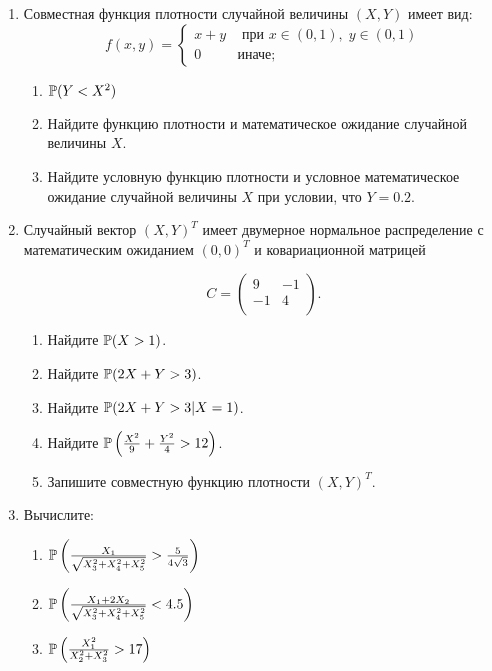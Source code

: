 \begin{enumerate}
\item  Совместная функция плотности случайной величины $(X,Y)$ имеет вид:
\begin{equation*}
f(x,y) =
 \begin{cases}
   x+y &\text{ при }x \in (0,1),\;y \in (0,1) \\
   0 &\text{иначе};
 \end{cases}
\end{equation*}

\begin{enumerate}
\item $\P(Y<X^2)$
\item Найдите функцию плотности и математическое ожидание случайной величины $X$.
\item Найдите условную функцию плотности и условное математическое ожидание случайной
величины $X$ при условии, что $Y=0.2$.
\end{enumerate}

\item Случайный вектор $(X,Y)^T$ имеет двумерное нормальное распределение
с математическим ожиданием $(0,0)^T$ и ковариационной матрицей

\[
C = \begin{pmatrix}
9 & -1 \\
-1 & 4 \\
\end{pmatrix}.
\]

\begin{enumerate}
\item Найдите $\P(X>1)$.
\item Найдите $\P(2X+Y>3)$.
\item Найдите $\P(2X+Y>3|X=1)$.
\item Найдите $\P\left(\frac{X^2}{9}+\frac{Y^2}{4} >12\right)$.
\item Запишите совместную функцию плотности  $(X,Y)^T$.
\end{enumerate}

\item Вычислите:
\begin{enumerate}
\item $\P\left(\frac{X_1}{\sqrt{X_3^2+X_4^2+X_5^2}}>\frac{5}{4\sqrt{3}}\right)$
\item $\P\left(\frac{X_1+2X_2}{\sqrt{X_3^2+X_4^2+X_5^2}}<4.5\right)$
\item $\P\left(\frac{X_1^2}{X_2^2+X_3^2}>17\right)$
\end{enumerate}


\end{enumerate}
